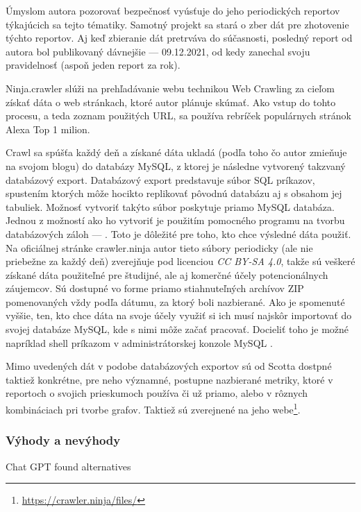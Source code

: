 Úmyslom autora pozorovať bezpečnosť vyúsťuje do jeho periodických reportov týkajúcich sa tejto tématiky. 
Samotný projekt sa stará o zber dát pre zhotovenie týchto reportov.
Aj keď zbieranie dát pretrváva do súčasnosti, posledný report od autora bol publikovaný dávnejšie --- 09.12.2021, od kedy zanechal svoju pravidelnosť (aspoň jeden report za rok).

Ninja.crawler slúži na prehľadávanie webu technikou Web Crawling za cieľom získať dáta o web stránkach, ktoré autor plánuje skúmať.
Ako vstup do tohto procesu, a teda zoznam použitých URL, sa používa rebríček populárnych stránok Alexa Top 1 milion.

Crawl sa spúšťa každý deň a získané dáta ukladá (podľa toho čo autor zmieňuje na svojom blogu) do databázy MySQL, z ktorej je následne vytvorený takzvaný databázový export.
Databázový export predstavuje súbor SQL príkazov, spustením ktorých môže hocikto replikovať pôvodnú databázu aj s obsahom jej tabuliek. 
Možnosť vytvoriť takýto súbor poskytuje priamo MySQL databáza. 
Jednou z možností ako ho vytvoriť je použitím pomocného programu na tvorbu databázových záloh ---  \cite{mysql-doc}.
Toto je dôležité pre toho, kto chce výsledné dáta použiť. 
Na oficiálnej stránke crawler.ninja autor tieto súbory periodicky (ale nie priebežne za každý deň) zverejňuje pod licenciou \textit{CC BY-SA 4.0}, takže sú veškeré získané dáta použiteľné pre študijné, ale aj komerčné účely potencionálnych záujemcov.
Sú dostupné vo forme priamo stiahnuteľných archívov ZIP pomenovaných vždy podľa dátumu, za ktorý boli nazbierané.
Ako je spomenuté vyššie, ten, kto chce dáta na svoje účely využiť si ich musí najskôr importovať do svojej databáze MySQL, kde s nimi môže začať pracovať.
Docieliť toho je možné napríklad shell príkazom  v administrátorskej konzole MySQL \cite{mysql-doc}.

Mimo uvedených dát v podobe databázových exportov sú od Scotta dostpné taktiež konkrétne, pre neho významné, postupne nazbierané metriky, ktoré v reportoch o svojich prieskumoch používa či už priamo, alebo v rôznych kombináciach pri tvorbe grafov. Taktiež sú zverejnené na jeho webe\footnote{\href{https://crawler.ninja/files/}{https://crawler.ninja/files/}}.

\subsubsection{Výhody a nevýhody}



Chat GPT found alternatives
